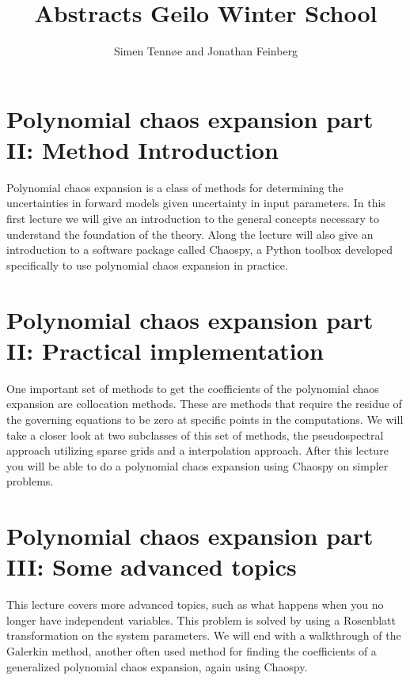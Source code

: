 \documentclass[a4paper,10pt]{article}
\title{Abstracts Geilo Winter School}
\author{Simen Tennøe and Jonathan Feinberg}
\begin{document}
\maketitle
\newpage


\section{Polynomial chaos expansion part II: Method Introduction}

Polynomial chaos expansion is a class of methods for determining the
uncertainties in forward models given uncertainty in input parameters.
In this first lecture we will give an introduction to the general
concepts necessary to understand the foundation of the theory.
Along the lecture will also give an introduction to a software
package called Chaospy, a Python toolbox developed specifically to
use polynomial chaos expansion in practice.



\section{Polynomial chaos expansion part II: Practical implementation}
One important set of methods to get the coefficients of the
polynomial chaos expansion are collocation methods.
These are methods that require the residue of the governing
equations to be zero at specific points in the computations.
We will take a closer look at two subclasses of this set of
methods, the pseudospectral approach utilizing sparse grids and a
interpolation approach.  After this lecture you will be able to do
a polynomial chaos expansion using Chaospy on simpler problems.




\section{Polynomial chaos expansion part III: Some advanced topics}
This lecture covers more advanced topics, such as what happens when
you no longer have independent variables.
This problem is solved by using a Rosenblatt transformation on the
system parameters.
We will end with a walkthrough of the Galerkin method, another
often used method for finding the coefficients of a generalized
polynomial chaos expansion, again using Chaospy.
\end{document}
